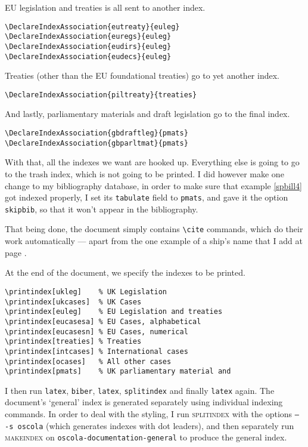 \documentclass[a5paper,fontsize=9pt,DIV=1]{scrartcl}
\begin{document}
EU legislation and treaties is all sent to another index.
\begin{verbatim}
\DeclareIndexAssociation{eutreaty}{euleg}
\DeclareIndexAssociation{euregs}{euleg}
\DeclareIndexAssociation{eudirs}{euleg}
\DeclareIndexAssociation{eudecs}{euleg}
\end{verbatim}

Treaties (other than the EU foundational treaties) go to yet another index.

\begin{verbatim}
\DeclareIndexAssociation{piltreaty}{treaties}
\end{verbatim}

And lastly, parliamentary materials and draft legislation go to the final index.
\begin{verbatim}
\DeclareIndexAssociation{gbdraftleg}{pmats}
\DeclareIndexAssociation{gbparltmat}{pmats}
\end{verbatim}

With that, all the indexes we want are hooked up. Everything else is going to go to the trash index, which is not going to be printed. I did however make one change to my bibliography database, in order to make sure that example \ref{spbill4} got indexed properly, I set its \texttt{tabulate} field to \texttt{pmats}, and gave it the option \texttt{skipbib}, so that it won't appear in the bibliography.

That being done, the document simply contains \verb|\cite| commands, which do their work automatically --- apart from the one example of a ship's name that I add at page \pageref{antaios85}.

At the end of the document, we specify the indexes to be printed.

\begin{verbatim}
\printindex[ukleg]    % UK Legislation
\printindex[ukcases]  % UK Cases
\printindex[euleg]    % EU Legislation and treaties
\printindex[eucasesa] % EU Cases, alphabetical
\printindex[eucasesn] % EU Cases, numerical
\printindex[treaties] % Treaties
\printindex[intcases] % International cases
\printindex[ocases]   % All other cases
\printindex[pmats]    % UK parliamentary material and
\end{verbatim}

I then run \texttt{latex}, \texttt{biber}, \texttt{latex}, \texttt{splitindex} and finally \texttt{latex} again. The document's `general' index is generated separately using individual indexing commands. In order to deal with the styling, I run \textsc{splitindex} with the options \texttt{-- -s oscola} (which generates indexes with dot leaders), and then separately run \textsc{makeindex} on \texttt{oscola-documentation-general} to produce the general index.
\end{document}
